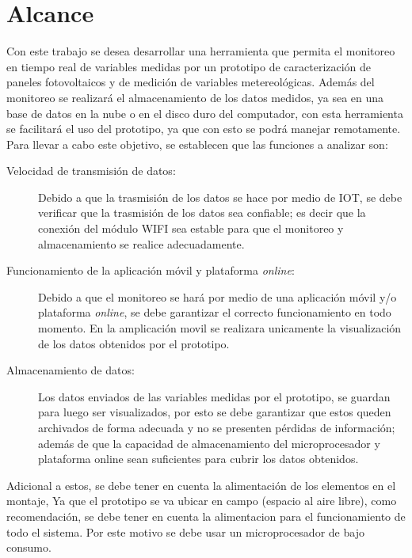 \chapter{Alcance}
Con este trabajo se desea desarrollar una herramienta que permita el monitoreo en tiempo real de variables medidas por un prototipo de caracterización de paneles fotovoltaicos y de medición de variables metereológicas. Además del monitoreo se realizará el almacenamiento de los datos medidos, ya sea en una base de datos en la nube o en el disco duro del computador, con esta herramienta se facilitará el uso del prototipo, ya que con esto se podrá manejar remotamente. Para llevar a cabo este objetivo, se establecen que las funciones a analizar son:

\begin{description}

\item[Velocidad de transmisión de datos:] Debido a que la trasmisión de los datos se hace por medio de IOT, se debe verificar que la trasmisión de los datos sea confiable; es decir que la conexión del módulo WIFI sea estable para que el monitoreo y almacenamiento se realice adecuadamente.

\item[Funcionamiento de la aplicación móvil y plataforma \textit{online}:]Debido a que el monitoreo se hará por medio de una aplicación móvil y/o plataforma \textit{online}, se debe garantizar el correcto funcionamiento en todo momento. En la amplicación movil se realizara unicamente la visualización de los datos obtenidos por el prototipo. 

\item[Almacenamiento de datos:]Los datos enviados de las variables medidas por el prototipo, se guardan para luego ser visualizados, por esto se debe garantizar que estos queden archivados de forma adecuada y no se presenten pérdidas de información; además de que la capacidad de almacenamiento del microprocesador y plataforma online sean suficientes para cubrir los datos obtenidos.
\end{description} 

Adicional a estos, se debe tener en cuenta la alimentación de los elementos en el montaje, Ya que el prototipo se va ubicar en campo (espacio al aire libre), como recomendación, se debe tener en cuenta la alimentacion para el funcionamiento de todo el sistema. Por este motivo se debe usar un microprocesador de bajo consumo. 

 
 
 
  
  

